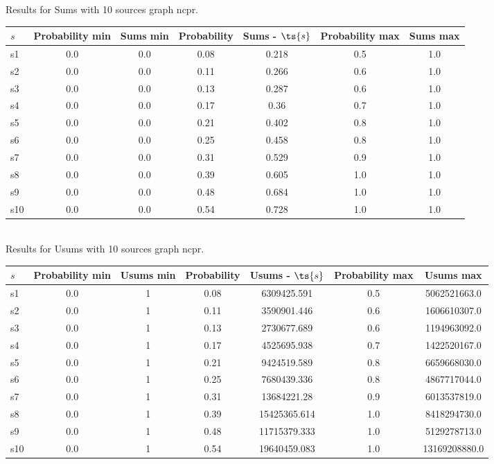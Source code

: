 \documentclass{article}
\begin{document}
\noindent Results for Sums with 10 sources graph ncpr.

\noindent\begin{tabular}{|l|c|c|c|c|c|c|}
\hline
$s$& Probability min & Sums min & Probability & Sums - $\ts{s}$ & Probability max & Sums max\\
\hline
s1 &0.0 & 0.0 & 0.08 & 0.218 & 0.5 & 1.0\\
\hline
s2 &0.0 & 0.0 & 0.11 & 0.266 & 0.6 & 1.0\\
\hline
s3 &0.0 & 0.0 & 0.13 & 0.287 & 0.6 & 1.0\\
\hline
s4 &0.0 & 0.0 & 0.17 & 0.36 & 0.7 & 1.0\\
\hline
s5 &0.0 & 0.0 & 0.21 & 0.402 & 0.8 & 1.0\\
\hline
s6 &0.0 & 0.0 & 0.25 & 0.458 & 0.8 & 1.0\\
\hline
s7 &0.0 & 0.0 & 0.31 & 0.529 & 0.9 & 1.0\\
\hline
s8 &0.0 & 0.0 & 0.39 & 0.605 & 1.0 & 1.0\\
\hline
s9 &0.0 & 0.0 & 0.48 & 0.684 & 1.0 & 1.0\\
\hline
s10 &0.0 & 0.0 & 0.54 & 0.728 & 1.0 & 1.0\\
\hline
\end{tabular}\\

\noindent Results for Usums with 10 sources graph ncpr.

\noindent\begin{tabular}{|l|c|c|c|c|c|c|}
\hline
$s$& Probability min & Usums min & Probability & Usums - $\ts{s}$ & Probability max & Usums max\\
\hline
s1 &0.0 & 1 & 0.08 & 6309425.591 & 0.5 & 5062521663.0\\
\hline
s2 &0.0 & 1 & 0.11 & 3590901.446 & 0.6 & 1606610307.0\\
\hline
s3 &0.0 & 1 & 0.13 & 2730677.689 & 0.6 & 1194963092.0\\
\hline
s4 &0.0 & 1 & 0.17 & 4525695.938 & 0.7 & 1422520167.0\\
\hline
s5 &0.0 & 1 & 0.21 & 9424519.589 & 0.8 & 6659668030.0\\
\hline
s6 &0.0 & 1 & 0.25 & 7680439.336 & 0.8 & 4867717044.0\\
\hline
s7 &0.0 & 1 & 0.31 & 13684221.28 & 0.9 & 6013537819.0\\
\hline
s8 &0.0 & 1 & 0.39 & 15425365.614 & 1.0 & 8418294730.0\\
\hline
s9 &0.0 & 1 & 0.48 & 11715379.333 & 1.0 & 5129278713.0\\
\hline
s10 &0.0 & 1 & 0.54 & 19640459.083 & 1.0 & 13169208880.0\\
\hline
\end{tabular}\\
\end{document}
